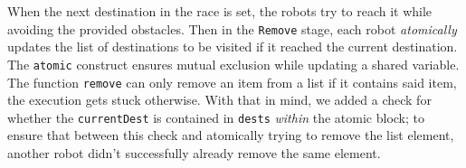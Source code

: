  When the next destination in the race is set, the robots try to reach it while avoiding the provided obstacles. Then in the \verb|Remove| stage, each robot \emph{atomically} updates the list of destinations to be visited if it reached the current destination. The \verb|atomic| construct ensures mutual exclusion while updating a shared variable. The function \verb|remove| can only remove an item from a list if it contains said item, the execution gets stuck otherwise. With that in mind, we added a check for whether the \verb|currentDest| is contained in \verb|dests| \emph{within} the atomic block; to ensure that between this check and atomically trying to remove the list element, another robot didn't successfully already remove the same element. 